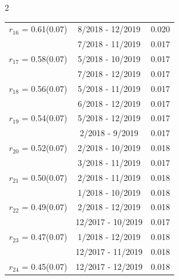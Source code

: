 \begin{multicols}{2}
{\begin{tabular}{ccc}
  $r_{16}$ = 0.61(0.07) &       8/2018 - 12/2019 &        0.020   \vspace{-.10in} \\  
&        7/2018 - 11/2019 &        0.017  \vspace{-.02in} \\ \hline 
  $r_{17}$ = 0.58(0.07) &       5/2018 - 10/2019 &        0.017   \vspace{-.10in} \\  
&        7/2018 - 12/2019 &        0.017  \vspace{-.02in} \\ \hline 
  $r_{18}$ = 0.56(0.07) &       5/2018 - 11/2019 &        0.017   \vspace{-.10in} \\  
&        6/2018 - 12/2019 &        0.017  \vspace{-.02in} \\ \hline 
  $r_{19}$ = 0.54(0.07) &       5/2018 - 12/2019 &        0.017   \vspace{-.10in} \\  
&        2/2018 -  9/2019 &        0.017  \vspace{-.02in} \\ \hline 
  $r_{20}$ = 0.52(0.07) &       2/2018 - 10/2019 &        0.018   \vspace{-.10in} \\  
&        3/2018 - 11/2019 &        0.017  \vspace{-.02in} \\ \hline 
  $r_{21}$ = 0.50(0.07) &       2/2018 - 11/2019 &        0.018   \vspace{-.10in} \\  
&        1/2018 - 10/2019 &        0.018  \vspace{-.02in} \\ \hline 
  $r_{22}$ = 0.49(0.07) &       2/2018 - 12/2019 &        0.018   \vspace{-.10in} \\  
&       12/2017 - 10/2019 &        0.017  \vspace{-.02in} \\ \hline 
  $r_{23}$ = 0.47(0.07) &       1/2018 - 12/2019 &        0.018   \vspace{-.10in} \\  
&       12/2017 - 11/2019 &        0.018  \vspace{-.02in} \\ \hline 
  $r_{24}$ = 0.45(0.07) &      12/2017 - 12/2019 &        0.018   \vspace{-.10in} \\  

\end{tabular}}
\end{multicols}
